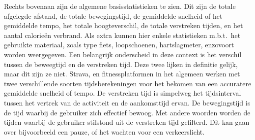 Rechts bovenaan zijn de algemene basisstatistieken te zien. Dit zijn de totale
afgelegde afstand, de totale bewegingstijd, de gemiddelde snelheid of het
gemiddelde tempo, het totale hoogteverschil, de totale verstreken tijden, en
het aantal calorieën verbrand. Als extra kunnen hier enkele statistieken
m.b.t.\ het gebruikte materiaal, zoals type fiets, loopschoenen, hartslagmeter,
enzovoort worden weergegeven. Een belangrijk onderscheid in deze context is het
verschil tussen de beweegtijd en de verstreken tijd. Deze twee lijken in
definitie gelijk, maar dit zijn ze niet. Strava, en fitnessplatformen in het
algemeen werken met twee verschillende soorten tijdsberekeningen voor het
bekomen van een accuratere gemiddelde snelheid of tempo. De verstreken tijd is
simpelweg het tijdsinterval tussen het vertrek van de activiteit en de
aankomsttijd ervan. De bewegingstijd is de tijd waarbij de gebruiker zich
effectief bewoog. Met andere woorden worden de tijden waarbij de gebruiker
stilstond uit de verstreken tijd gefilterd. Dit kan gaan over bijvoorbeeld een
pauze, of het wachten voor een verkeerslicht.

